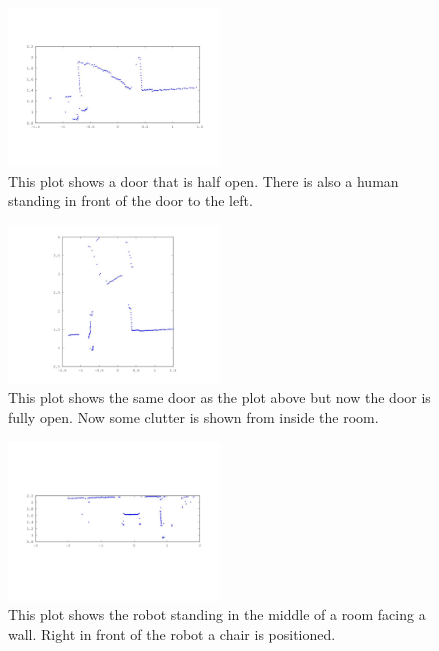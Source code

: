 \documentclass[a4paper, 10pt, conference]{ieeeconf}      %
\begin{document}
\begin{figure}
\centering
\includegraphics[width=0.5\textwidth]{presimg/doorhalf.jpg}
\caption{This plot shows a door that is half open. There is also a human standing in front of the door to the left.}
\label{doorhalf}
\end{figure}

\begin{figure}
\centering
\includegraphics[width=0.5\textwidth]{presimg/doorfull.jpg}
\caption{This plot shows the same door as the plot above but now the door is fully open. Now some clutter is shown from inside the room.}
\label{doorfull}
\end{figure}

\begin{figure}
\centering
\includegraphics[width=0.5\textwidth]{presimg/chair.jpg}
\caption{This plot shows the robot standing in the middle of a room facing a wall. Right in front of the robot a chair is positioned.}
\label{chair}
\end{figure}
\end{document}
